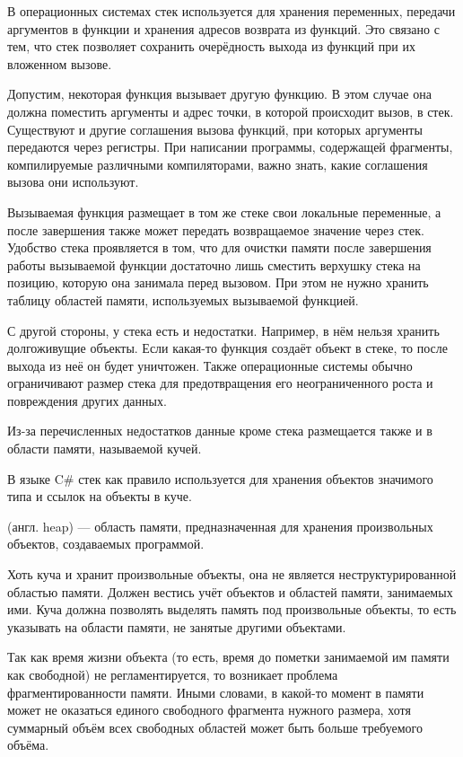 В операционных системах стек используется для хранения переменных,
передачи аргументов в функции и хранения адресов возврата из функций.
Это связано с тем, что стек позволяет сохранить очерёдность выхода из
функций при их вложенном вызове.

Допустим, некоторая функция вызывает другую функцию. В этом случае
она должна поместить аргументы и адрес точки, в которой происходит
вызов, в стек. Существуют и другие соглашения вызова функций, при
которых аргументы передаются через регистры. При написании программы,
содержащей фрагменты, компилируемые различными компиляторами, важно
знать, какие соглашения вызова они используют.

Вызываемая функция размещает в том же стеке свои локальные переменные,
а после завершения также может передать возвращаемое значение через
стек. Удобство стека проявляется в том, что для очистки памяти после
завершения работы вызываемой функции достаточно лишь сместить верхушку
стека на позицию, которую она занимала перед вызовом. При этом не
нужно хранить таблицу областей памяти, используемых вызываемой
функцией.

С другой стороны, у стека есть и недостатки. Например, в нём нельзя
хранить долгоживущие объекты. Если какая-то функция создаёт объект в
стеке, то после выхода из неё он будет уничтожен. Также операционные
системы обычно ограничивают размер стека для предотвращения его
неограниченного роста и повреждения других данных.

Из-за перечисленных недостатков данные кроме стека размещается также
и в области памяти, называемой кучей.

В языке C\# стек как правило используется для хранения объектов
значимого типа и ссылок на объекты в куче.


\begin{defn}
 (англ. heap) — область памяти, предназначенная для
хранения произвольных объектов, создаваемых программой.
\end{defn}

Хоть куча и хранит произвольные объекты, она не является
неструктурированной областью памяти. Должен вестись учёт объектов и
областей памяти, занимаемых ими. Куча должна позволять выделять память
под произвольные объекты, то есть указывать на области памяти, не
занятые другими объектами.

Так как время жизни объекта (то есть, время до пометки занимаемой им
памяти как свободной) не регламентируется, то возникает проблема
фрагментированности памяти. Иными словами, в какой-то момент в памяти
может не оказаться единого свободного фрагмента нужного размера, хотя
суммарный объём всех свободных областей может быть больше требуемого
объёма.

